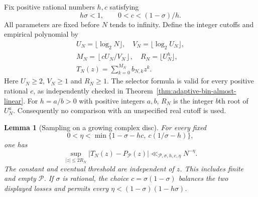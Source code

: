 \documentclass[11pt]{article}
\newtheorem{lemma}[theorem]{Lemma}
\theoremstyle{definition}
\begin{document}
Fix positive rational numbers $h,c$ satisfying
\begin{equation}
 h\sigma<1,\qquad 0<c<(1-\sigma)/h .
 \label{eq:finite-decoding-parameter-domain}
\end{equation}
All parameters are fixed before $N$ tends to infinity.
Define the integer cutoffs and empirical polynomial by
\begin{equation}
 \begin{gathered}
 U_N=\lfloor\log_2N\rfloor,\quad
 V_N=\lfloor\log_2U_N\rfloor,\\
 M_N=\left\lfloor cU_N/V_N\right\rfloor,\quad
 R_N=\lfloor U_N^h\rfloor,\\
 T_N(z)=\sum_{k=0}^{M_N}b_{N,k}z^k .
 \end{gathered}
 \label{eq:finite-decoding-polynomial}
\end{equation}
Here $U_N\ge2$, $V_N\ge1$ and $R_N\ge1$.
The selector formula is valid for every positive rational $c$,
as independently checked in
Theorem~\ref{thm:adaptive-bin-almost-linear}.
For $h=a/b>0$ with positive integers $a,b$,
$R_N$ is the integer $b$th root of $U_N^a$.
Consequently no comparison with an unspecified real cutoff is used.

\begin{lemma}[Sampling on a growing complex disc]
\label{lem:finite-decoding-complex-error}
For every fixed
\begin{equation}
 0<\eta<\min\{1-\sigma-hc,\ c(1/\sigma-h)\},
 \label{eq:finite-decoding-error-exponent}
\end{equation}
one has
\begin{equation}
 \sup_{|z|\le2R_N}|T_N(z)-P_{\mathcal P}(z)|
                      \ll_{\mathcal P,\sigma,h,c,\eta}N^{-\eta}.
 \label{eq:finite-decoding-complex-error}
\end{equation}
The constant and eventual threshold are independent of $z$.
This includes finite and empty $\mathcal P$.
If $\sigma$ is rational, the choice $c=\sigma(1-\sigma)$
balances the two displayed losses and permits every
$\eta<(1-\sigma)(1-h\sigma)$.
\end{lemma}
\end{document}
